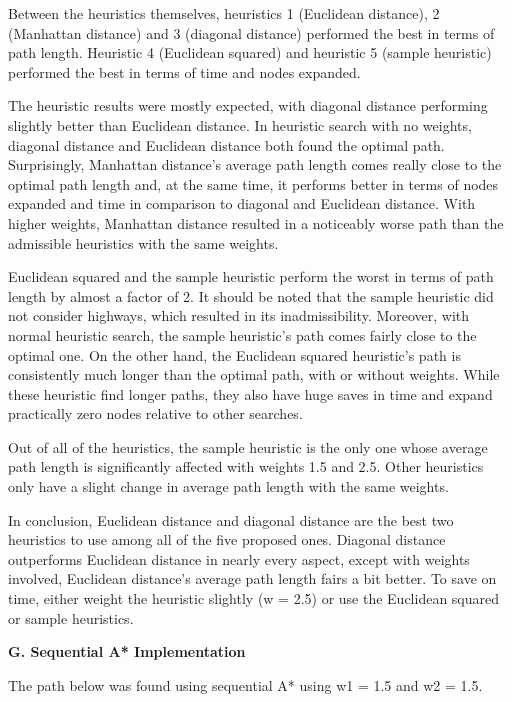 \documentclass[12pt, letterpaper]{article}
\begin{document}
Between the heuristics themselves, heuristics 1 (Euclidean distance), 2 (Manhattan distance) and 3 (diagonal distance) performed the best in terms of path length. Heuristic 4 (Euclidean squared) and heuristic 5 (sample heuristic) performed the best in terms of time and nodes expanded.

The heuristic results were mostly expected, with diagonal distance performing slightly better than Euclidean distance. In heuristic search with no weights, diagonal distance and Euclidean distance both found the optimal path. Surprisingly, Manhattan distance's average path length comes really close to the optimal path length and, at the same time, it performs better in terms of nodes expanded and time in comparison to diagonal and Euclidean distance. With higher weights, Manhattan distance resulted in a noticeably worse path than the admissible heuristics with the same weights. 

Euclidean squared and the sample heuristic perform the worst in terms of path length by almost a factor of 2. It should be noted that the sample heuristic did not consider highways, which resulted in its inadmissibility. Moreover, with normal heuristic search, the sample heuristic's path comes fairly close to the optimal one. On the other hand, the Euclidean squared heuristic's path is consistently much longer than the optimal path, with or without weights. While these heuristic find longer paths, they also have huge saves in time and expand practically zero nodes relative to other searches.

Out of all of the heuristics, the sample heuristic is the only one whose average path length is significantly affected with weights 1.5 and 2.5. Other heuristics only have a slight change in average path length with the same weights.


In conclusion, Euclidean distance and diagonal distance are the best two heuristics to use among all of the five proposed ones. Diagonal distance outperforms Euclidean distance in nearly every aspect, except with weights involved, Euclidean distance's average path length fairs a bit better. To save on time, either weight the heuristic slightly (w = 2.5) or use the Euclidean squared or sample heuristics. 

\pagebreak %

\noindent \textbf{G. Sequential A* Implementation}

 The path below was found using sequential A* using w1 = 1.5 and w2 = 1.5.
\end{document}
